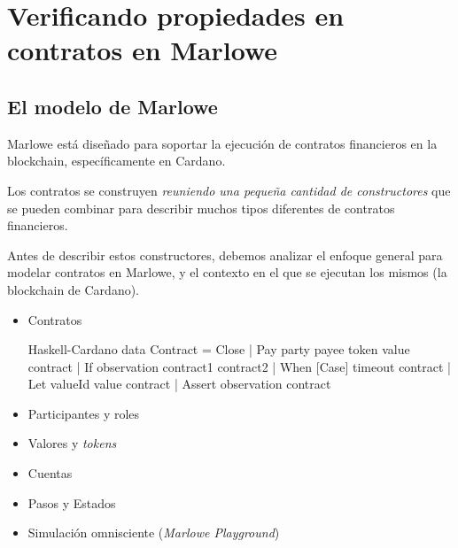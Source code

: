 \documentclass{beamer}
\begin{document}
\section{Verificando propiedades en contratos en Marlowe}

\subsection{El modelo de Marlowe}

\begin{frame}
Marlowe está diseñado para soportar la ejecución de contratos financieros en la blockchain, específicamente en Cardano.

\medskip
\pause

Los contratos se construyen \textit{reuniendo una pequeña cantidad de constructores} que se pueden combinar para describir muchos tipos diferentes de contratos financieros.

\medskip
\pause

Antes de describir estos constructores, debemos analizar el enfoque general para modelar contratos en Marlowe, y el contexto en el que se ejecutan los mismos (la blockchain de Cardano).

\end{frame}

\begin{frame}[fragile]
\begin{itemize}
    \item Contratos
        \pause

\begin{code}[title=Tipos de contratos en Marlowe.]{Haskell-Cardano}
data Contract = Close
              | Pay party payee token value contract
              | If observation contract1 contract2
              | When [Case] timeout contract
              | Let valueId value contract
              | Assert observation contract
\end{code}
        \pause
    \item Participantes y roles
        \pause
    \item Valores y \textit{tokens}
        \pause
    \item Cuentas
        \pause
    \item Pasos y Estados
        \pause
    \item Simulación omnisciente (\textit{Marlowe Playground})

\end{itemize}

\end{frame}
\end{document}
